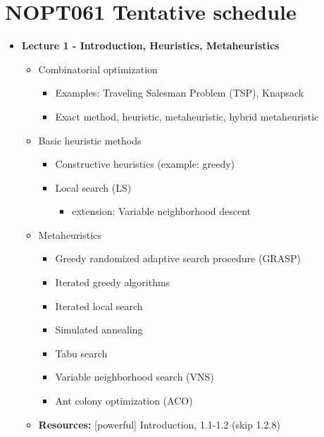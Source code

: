 \documentclass{article}
\begin{document}
\section*{NOPT061 Tentative schedule}

\begin{itemize}

    \item \textbf{Lecture 1 - Introduction, Heuristics, Metaheuristics}
    \begin{itemize}
        \item Combinatorial optimization
        \begin{itemize}
            \item Examples: Traveling Salesman Problem (TSP), Knapsack
            \item Exact method, heuristic, metaheuristic, hybrid metaheuristic
        \end{itemize}
        \item Basic heuristic methods
        \begin{itemize}
            \item Constructive heuristics (example: greedy)
            \item Local search (LS)
            \begin{itemize}
                \item extension: Variable neighborhood descent
            \end{itemize}
        \end{itemize}
        \item Metaheuristics
        \begin{itemize}
            \item Greedy randomized adaptive search procedure (GRASP)
            \item Iterated greedy algorithms
            \item Iterated local search
            \item Simulated annealing
            \item Tabu search
            \item Variable neighborhood search (VNS)
            \item Ant colony optimization (ACO)
        \end{itemize}
        \item \textbf{Resources:} [powerful] Introduction, 1.1-1.2 (skip 1.2.8)
    \end{itemize}


\end{itemize}
\end{document}
